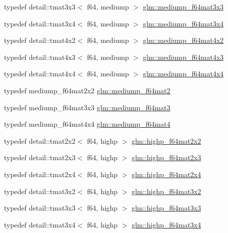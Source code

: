 \begin{CompactItemize}
typedef detail::tmat3x3$<$ f64, mediump $>$ \hyperlink{group__gtc__type__precision_g871b69a221dae7461aa746e6e6d372fc}{glm::mediump\_\-f64mat3x3}
\item 
typedef detail::tmat3x4$<$ f64, mediump $>$ \hyperlink{group__gtc__type__precision_gc3b0ca6d79631a2480cee8897dcd79ec}{glm::mediump\_\-f64mat3x4}
\item 
typedef detail::tmat4x2$<$ f64, mediump $>$ \hyperlink{group__gtc__type__precision_g4a7a2b6889f08c9209a4f994fd87cc4e}{glm::mediump\_\-f64mat4x2}
\item 
typedef detail::tmat4x3$<$ f64, mediump $>$ \hyperlink{group__gtc__type__precision_g4a920abfb082b0ffd8d89614cb787021}{glm::mediump\_\-f64mat4x3}
\item 
typedef detail::tmat4x4$<$ f64, mediump $>$ \hyperlink{group__gtc__type__precision_g941e42a0b337b5c8ad9c324aaa6b2ad5}{glm::mediump\_\-f64mat4x4}
\item 
typedef mediump\_\-f64mat2x2 \hyperlink{group__gtc__type__precision_ga7eac0340d2aaf670ec4dfbd1826fd35}{glm::mediump\_\-f64mat2}
\item 
typedef mediump\_\-f64mat3x3 \hyperlink{group__gtc__type__precision_ge38a4a0b57e25d9cbb153dcaab9432ec}{glm::mediump\_\-f64mat3}
\item 
typedef mediump\_\-f64mat4x4 \hyperlink{group__gtc__type__precision_g2763f655bfe2141a014e66d26a9d2f18}{glm::mediump\_\-f64mat4}
\item 
typedef detail::tmat2x2$<$ f64, highp $>$ \hyperlink{group__gtc__type__precision_g4babca568fc88f185620c02e4fdac0d8}{glm::highp\_\-f64mat2x2}
\item 
typedef detail::tmat2x3$<$ f64, highp $>$ \hyperlink{group__gtc__type__precision_gfb5b42b29b3bd7f1605483223fa35312}{glm::highp\_\-f64mat2x3}
\item 
typedef detail::tmat2x4$<$ f64, highp $>$ \hyperlink{group__gtc__type__precision_g72fae79e6633cbc6bf691f69278b36d3}{glm::highp\_\-f64mat2x4}
\item 
typedef detail::tmat3x2$<$ f64, highp $>$ \hyperlink{group__gtc__type__precision_g5cdc9d6fb9ce07e5485c4e2db919ce7e}{glm::highp\_\-f64mat3x2}
\item 
typedef detail::tmat3x3$<$ f64, highp $>$ \hyperlink{group__gtc__type__precision_gf520a9307867c632408029a53af3e375}{glm::highp\_\-f64mat3x3}
\item 
typedef detail::tmat3x4$<$ f64, highp $>$ \hyperlink{group__gtc__type__precision_g4144f547189dd7e52b4dd282f41a1cd1}{glm::highp\_\-f64mat3x4}
\item 

\end{CompactItemize}
